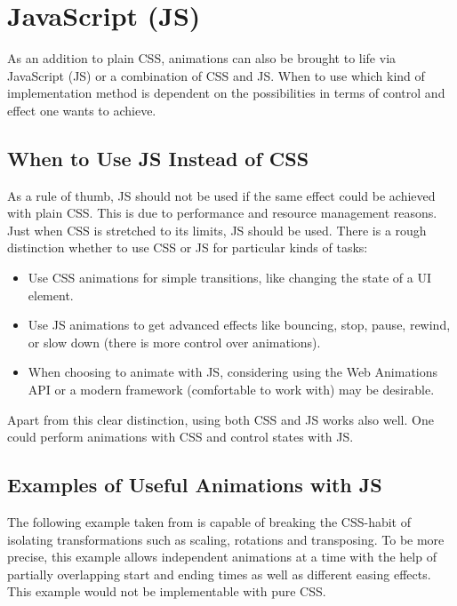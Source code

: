 %
%
% 
% 
% 


\chapter{JavaScript (JS)}

\label{chap:JS}

As an addition to plain CSS, animations can also be brought to life via 
JavaScript (JS) or a combination of CSS and JS. When to use which kind of 
implementation method is dependent on the possibilities in terms of control and 
effect one wants to achieve. 

\section{When to Use JS Instead of CSS}

As a rule of thumb, JS should not be used if the same effect could be achieved 
with plain CSS. This is due to performance and resource management reasons. 
Just when CSS is stretched to its limits, JS should be used. There is a rough 
distinction whether to use CSS or JS for particular kinds of tasks:
\begin{itemize}
	\item Use CSS animations for simple transitions, like changing the 
state of a UI element.
	\item Use JS animations to get advanced effects like bouncing, stop, 
pause, rewind, or slow down (there is more control over animations).
	\item When choosing to animate with JS, considering using the Web 
Animations API or a modern framework (comfortable to work with) may be 
desirable.
\end{itemize}
Apart from this clear distinction, using both CSS and JS works also well. One 
could perform animations with CSS and control states with JS.
\citep{googleDev}

\section{Examples of Useful Animations with JS}

The following example taken from \citet{transformsJS} is capable of breaking 
the CSS-habit of isolating transformations such as scaling, rotations and 
transposing. To be more precise, this example allows independent animations at 
a time with the help of partially overlapping start and ending times as well as 
different easing effects. This example would not be implementable with pure CSS.

